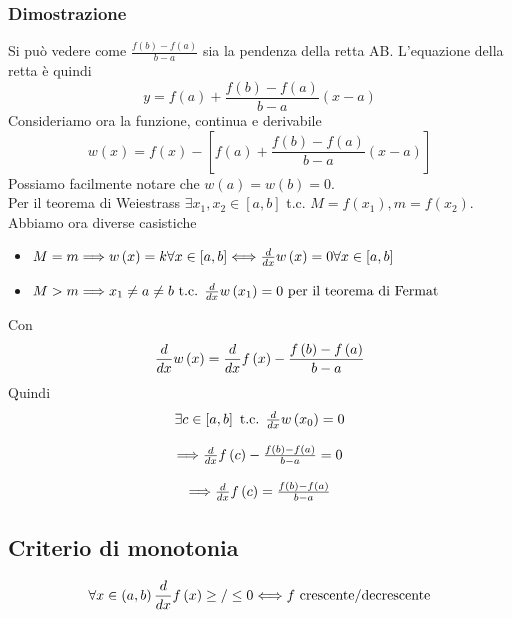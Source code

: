 \documentclass{report}
\begin{document}
        \subsubsection{Dimostrazione}
            Si può vedere come $\frac{f\left(b\right) - f\left(a\right)}{b - a}$ sia la pendenza della retta AB.
            L'equazione della retta è quindi
            $$y = f\left(a\right) + \frac{f\left(b\right) - f\left(a\right)}{b - a}\left(x-a\right)$$
            Consideriamo ora la funzione, continua e derivabile
            $$w\left(x\right) = f\left(x\right) - \left[f\left(a\right) + \frac{f\left(b\right) - f\left(a\right)}{b - a}\left(x-a\right)\right]$$
            Possiamo facilmente notare che $w\left(a\right) = w\left(b\right) = 0$. \\
            Per il teorema di Weiestrass $\exists x_1, x_2 \in \left[a, b\right]$ t.c. $M = f\left(x_1\right), m = f\left(x_2\right)$.
            Abbiamo ora diverse casistiche
            \begin{itemize}
                \item $M = m \Longrightarrow w\left(x\right) = k \forall x \in \left[a, b\right] \Longleftrightarrow \D{x}w\left(x\right) = 0 \forall x \in \left[a, b\right]$
                \item $M > m \Longrightarrow x_1 \neq a \neq b \textrm{ t.c. } \D{x}w\left(x_1\right) = 0 \textrm{ per il teorema di Fermat}$
            \end{itemize}
            Con 
            $$\D{x}w\left(x\right) = \D{x}f\left(x\right) - \frac{f\left(b\right) - f\left(a\right)}{b - a}$$
           Quindi
           $$\begin{array}{c}
            \exists c \in \left[a, b\right] \textrm{ t.c. } \D{x}w\left(x_0\right) = 0 \\ \\
            \Longrightarrow \D{x}f\left(c\right) - \frac{f\left(b\right) - f\left(a\right)}{b - a} = 0 \\ \\
            \Longrightarrow \D{x}f\left(c\right) = \frac{f\left(b\right) - f\left(a\right)}{b - a}
           \end{array}$$
    \subsection{Criterio di monotonia}
        $$\forall x \in \left(a, b\right) \D{x}f\left(x\right) \geq/\leq 0 \Longleftrightarrow f \textrm{ crescente/decrescente}$$
\end{document}
